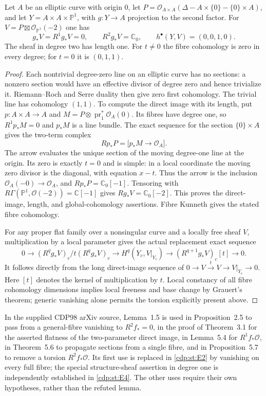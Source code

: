 
\begin{proposition}\label{cdp:st:E12}
Let $A$ be an elliptic curve with origin $0$, let
$P=\mathcal O_{A\times A}(\Delta-A\times\{0\}-\{0\}\times A)$,
and let $Y=A\times A\times\mathbb P^1$, with $g:Y\to A$
projection to the second factor. For
$V=P\boxtimes\mathcal O_{\mathbb P^1}(-2)$ one has
\[
 g_*V=R^1g_*V=0,\qquad R^2g_*V=\mathbb C_0,
 \qquad h^\bullet(Y,V)=(0,0,1,0).
\]
The sheaf in degree two has length one. For $t\ne0$ the fibre
cohomology is zero in every degree; for $t=0$ it is $(0,1,1)$.
\end{proposition}
\begin{proof}
Each nontrivial degree-zero line on an elliptic curve has no
sections: a nonzero section would have an effective divisor of
degree zero and hence trivialize it. Riemann--Roch and Serre
duality then give zero first cohomology. The trivial line has
cohomology $(1,1)$. To compute the direct image with its length,
put $p:A\times A\to A$ and $M=P\otimes\operatorname{pr}_1^*
\mathcal O_A(0)$. Its fibres have degree one, so
$R^1p_*M=0$ and $p_*M$ is a line bundle. The exact sequence for
the section $\{0\}\times A$ gives the two-term complex
\[
 Rp_*P=\bigl[p_*M\longrightarrow\mathcal O_A\bigr].
\]
The arrow evaluates the unique section of the moving degree-one
line at the origin. Its zero is exactly $t=0$ and is simple:
in a local coordinate the moving zero divisor is the diagonal,
with equation $x-t$. Thus the arrow is the inclusion
$\mathcal O_A(-0)\to\mathcal O_A$, and
$Rp_*P=\mathbb C_0[-1]$. Tensoring with
$R\Gamma(\mathbb P^1,\mathcal O(-2))=\mathbb C[-1]$
gives $Rg_*V=\mathbb C_0[-2]$. This proves the direct-image,
length, and global-cohomology assertions. Fibre Kunneth gives
the stated fibre cohomology.

For any proper flat family over a nonsingular curve and a locally
free sheaf $V$, multiplication by a local parameter gives the
actual replacement exact sequence
\[
0\to (R^qg_*V)_c/t(R^qg_*V)_c
 \to H^q(Y_c,V|_{Y_c})
 \to (R^{q+1}g_*V)_c[t]\to0.
\]
It follows directly from the long direct-image sequence of
$0\to V\xrightarrow{t}V\to V|_{Y_c}\to0$. Here $[t]$ denotes
the kernel of multiplication by $t$. Local constancy of all
fibre cohomology dimensions implies local freeness and base
change by Grauert's theorem; generic vanishing alone permits
the torsion explicitly present above.
\end{proof}

In the supplied CDP98 arXiv source, Lemma~1.5 is used in
Proposition~2.5 to pass from a general-fibre vanishing to
$R^2f_*=0$, in the proof of Theorem~3.1 for the asserted
flatness of the two-parameter direct image, in Lemma~5.4 for
$R^1f_*\mathcal O$, in Theorem~5.6 to propagate sections from a
single fibre, and in Proposition~5.7 to remove a torsion
$R^2f_*\mathcal O$. Its first use is replaced in \ref{cdp:st:E2} by vanishing
on every full fibre; the special structure-sheaf assertion in
degree one is independently established in \ref{cdp:st:E4}. The other uses
require their own hypotheses, rather than the refuted lemma.


